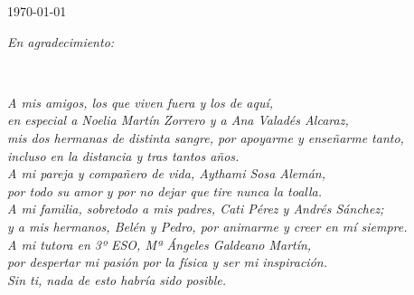\begin{titlepage}


{\large \today}\\[2cm] %



\vfill %

\end{titlepage}

\emptyPage

\begin{flushleft}
\vspace*{8cm} %

\emph{En agradecimiento:}

\end{flushleft}
~
\begin{flushright}
\vspace{1cm} %

\small
\emph{A mis amigos, los que viven fuera y los de aquí, }\\
\emph{en especial a Noelia Martín Zorrero y a Ana Valadés Alcaraz,}\\
\emph{mis dos hermanas de distinta sangre, por apoyarme y enseñarme tanto,}\\
\emph{incluso en la distancia y tras tantos años.}\\[1cm]

\emph{A mi pareja y compañero de vida, Aythami Sosa Alemán,}\\
\emph{por todo su amor y por no dejar que tire nunca la toalla.}\\[1cm]

\emph{A mi familia, sobretodo a mis padres, Cati Pérez y Andrés Sánchez; }\\
\emph{y a mis hermanos, Belén y Pedro, por animarme y creer en mí siempre.}\\[1cm]

\emph{A mi tutora en 3º ESO, Mª Ángeles Galdeano Martín,}\\
\emph{por despertar mi pasión por la física y ser mi inspiración.} \\
\emph{Sin ti, nada de esto habría sido posible.}\\
\end{flushright}

\vfill


\thispagestyle{empty}
